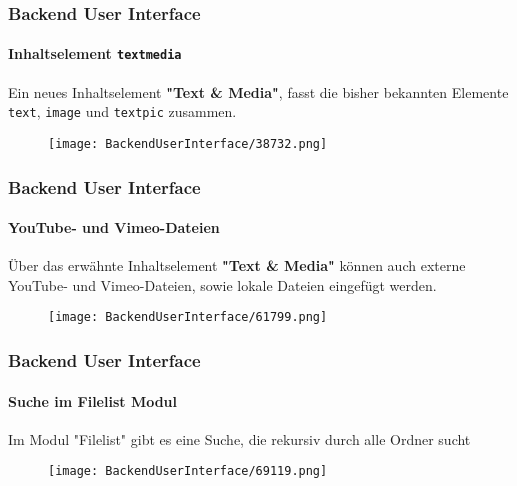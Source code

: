 \begin{frame}[fragile]
	\frametitle{Backend User Interface}
	\framesubtitle{Inhaltselement \texttt{textmedia}}

	Ein neues Inhaltselement \textbf{"Text \& Media"}, fasst die bisher bekannten
	Elemente \texttt{text}, \texttt{image} und \texttt{textpic} zusammen.

	\begin{figure}
		\texttt{[image: BackendUserInterface/38732.png]}
	\end{figure}

\end{frame}

\begin{frame}[fragile]
	\frametitle{Backend User Interface}
	\framesubtitle{YouTube- und Vimeo-Dateien}

	Über das erwähnte Inhaltselement \textbf{"Text \& Media"} können auch
	externe YouTube- und Vimeo-Dateien, sowie lokale Dateien eingefügt werden.

	\begin{figure}
		\texttt{[image: BackendUserInterface/61799.png]}
	\end{figure}

\end{frame}

\begin{frame}[fragile]
	\frametitle{Backend User Interface}
	\framesubtitle{Suche im Filelist Modul}

	Im Modul "Filelist" gibt es eine Suche, die rekursiv durch alle Ordner sucht

	\begin{figure}
		\texttt{[image: BackendUserInterface/69119.png]}
	\end{figure}

\end{frame}

